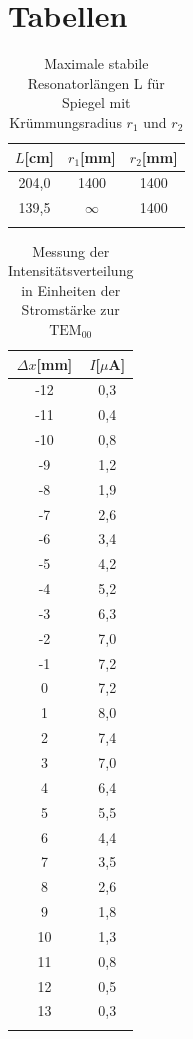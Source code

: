 \section{Tabellen}


\begin{table}
\centering
\caption{Maximale stabile Resonatorlängen L für Spiegel mit Krümmungsradius $r_1$ und $r_2$}
\begin{tabular}{c c c}
\toprule
{$L$[cm]} & {$r_1$[mm]} & {$r_2$[mm]}\\
\midrule
204,0  &  1400 & 1400\\
139,5  &  $\infty$ & 1400\\
\bottomrule
\label{tab:maximale Resonatorlängen}
\end{tabular}
\end{table}




\begin{table}
\centering
\caption{Messung der Intensitätsverteilung in Einheiten der Stromstärke zur $\text{TEM}_{00}$}
\begin{tabular}{c c}
\toprule
{$\Delta x$[mm]} & {$I$[$\mu$A]}\\
\midrule
-12	&	0,3	\\
-11	&	0,4	\\
-10	&	0,8	\\
-9	&	1,2	\\
-8	&	1,9	\\
-7	&	2,6	\\
-6	&	3,4	\\
-5	&	4,2	\\
-4	&	5,2	\\
-3	&	6,3	\\
-2	&	7,0	\\
-1	&	7,2	\\
0	&	7,2	\\
1	&	8,0	\\
2	&	7,4	\\
3	&	7,0	\\
4	&	6,4	\\
5	&	5,5	\\
6	&	4,4	\\
7	&	3,5	\\
8	&	2,6	\\
9	&	1,8	\\
10	&	1,3	\\
11	&	0,8	\\
12	&	0,5	\\
13	&	0,3	\\
\bottomrule
\label{tab:TEM_00}
\end{tabular}
\end{table}

